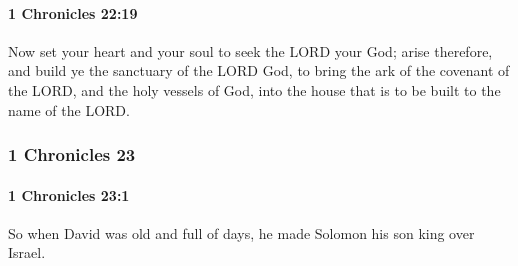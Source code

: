 		\paragraph{1 Chronicles 22:19} %
			\label{1CHRONICLES-22-19}

			Now set your heart and your soul to seek the LORD your God; arise therefore, and build ye the sanctuary of the LORD God, to bring the ark of the covenant of the LORD, and the holy vessels of God, into the house that is to be built to the name of the LORD.

	\subsubsection{1 Chronicles 23} %
		\label{1CHRONICLES-23}

		\paragraph{1 Chronicles 23:1} %
			\label{1CHRONICLES-23-1}

			So when David was old and full of days, he made Solomon his son king over Israel.

